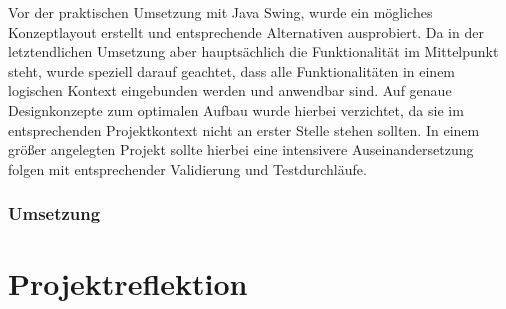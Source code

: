 \documentclass[a4paper]{article}
\begin{document}
Vor der praktischen Umsetzung mit Java Swing, wurde ein mögliches Konzeptlayout erstellt und entsprechende Alternativen ausprobiert.
Da in der letztendlichen Umsetzung aber hauptsächlich die Funktionalität im Mittelpunkt steht, wurde speziell darauf geachtet, dass alle Funktionalitäten in einem logischen Kontext eingebunden werden und anwendbar sind. Auf genaue Designkonzepte zum optimalen Aufbau wurde hierbei verzichtet, da sie im  entsprechenden Projektkontext nicht an erster Stelle stehen sollten. In einem größer angelegten Projekt sollte hierbei eine intensivere Auseinandersetzung folgen mit entsprechender Validierung und Testdurchläufe.\\

\parskip 12pt
\parindent 0pt

\subsubsection{Umsetzung}



\newpage

\section{Projektreflektion}

\newpage

\listoffigures

\newpage 

\listoftables
\end{document}
